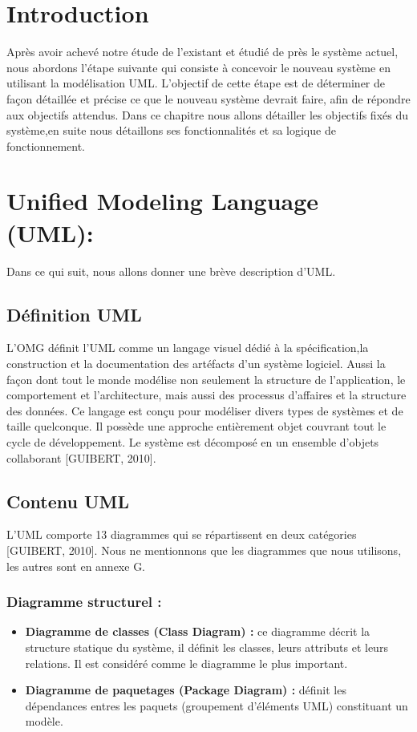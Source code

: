 

\section*{Introduction}
Après avoir achevé notre étude de l’existant et étudié de près le système actuel, nous abordons l’étape suivante qui consiste à concevoir le nouveau système en utilisant la modélisation UML. L’objectif de cette étape est de déterminer de façon détaillée et précise ce que le nouveau système devrait faire, afin de répondre aux objectifs attendus. Dans ce chapitre nous allons détailler les objectifs fixés du système,en suite nous détaillons ses fonctionnalités et sa logique de fonctionnement. 

 \section{Unified Modeling Language (UML):}
 Dans ce qui suit, nous allons donner une brève description d’UML.
 \subsection{ Définition UML }
 L’OMG définit l’UML comme un langage visuel dédié à la spécification,la construction et la documentation des artéfacts d’un système logiciel. Aussi la façon dont tout le monde modélise non seulement la structure de l’application, le comportement et l’architecture, mais aussi des processus d’affaires et la structure des données. Ce langage est conçu pour modéliser divers types de systèmes et de taille quelconque. Il possède une approche entièrement objet couvrant tout le cycle de développement. Le système est décomposé en un ensemble d’objets collaborant [GUIBERT, 2010].
 
 \subsection{Contenu UML}
 
 L’UML comporte 13 diagrammes qui se répartissent en deux catégories [GUIBERT, 2010]. Nous ne mentionnons que les diagrammes que nous utilisons, les autres sont en annexe G. 
 
 \subsubsection{Diagramme structurel : }
 \begin{itemize}
 \item \textbf{Diagramme de classes (Class Diagram) : }ce diagramme décrit la structure statique du système, il définit les classes, leurs attributs et leurs relations. Il est considéré comme le diagramme le plus important.
  \item  \textbf{Diagramme de paquetages (Package Diagram) : }définit les dépendances entres les paquets (groupement d’éléments UML) constituant un modèle. 
 \end{itemize}
 
